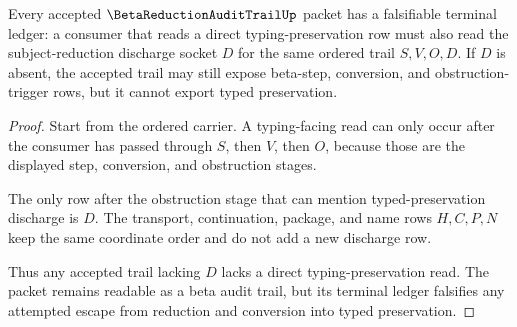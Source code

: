 \begin{theorem}
\label{thm:beta-reduction-audit-trail-stage-falsifiability}
Every accepted $\BetaReductionAuditTrailUp$ packet has a falsifiable terminal
ledger: a consumer that reads a direct typing-preservation row must also read
the subject-reduction discharge socket $D$ for the same ordered trail
$S,V,O,D$. If $D$ is absent, the accepted trail may still expose beta-step,
conversion, and obstruction-trigger rows, but it cannot export typed
preservation.
\end{theorem}
\begin{proof}
Start from the ordered carrier. A typing-facing read can only occur after the
consumer has passed through $S$, then $V$, then $O$, because those are the
displayed step, conversion, and obstruction stages.

The only row after the obstruction stage that can mention typed-preservation
discharge is $D$. The transport, continuation, package, and name rows
$H,C,P,N$ keep the same coordinate order and do not add a new discharge row.

Thus any accepted trail lacking $D$ lacks a direct typing-preservation read.
The packet remains readable as a beta audit trail, but its terminal ledger
falsifies any attempted escape from reduction and conversion into typed
preservation.
\end{proof}




